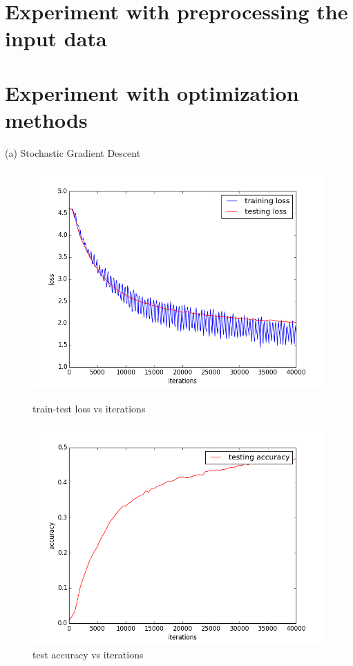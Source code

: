 \documentclass{article} %
\begin{document}
\section{Experiment with preprocessing the input data}
\section{Experiment with optimization methods}
(a) Stochastic Gradient Descent
\begin{figure}[H]
    \begin{minipage}{0.5\linewidth}
        \centering
        \includegraphics[scale=0.35]{SGD_1.png}
        \caption{train-test loss vs iterations}
    \end{minipage}
    \begin{minipage}{0.5\linewidth}
        \centering
        \includegraphics[scale=0.35]{SGD_2.png}
     \caption{test accuracy vs iterations}
    \end{minipage}
\end{figure}
\end{document}
